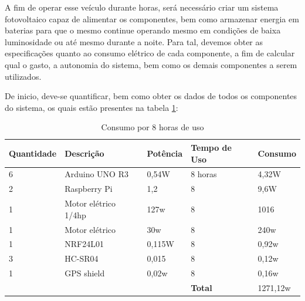 A fim de operar esse veículo durante horas, será necessário criar um sistema fotovoltaico capaz de alimentar os componentes, bem como armazenar energia em baterias para que o mesmo continue operando mesmo em condições de baixa luminosidade ou até mesmo durante a noite. Para tal, devemos obter as especificações quanto ao consumo elétrico de cada componente, a fim de calcular qual o gasto, a autonomia do sistema, bem como os demais componentes a serem utilizados.

De inicio, deve-se quantificar, bem como obter os dados de todos os componentes do sistema, os quais estão presentes na tabela \ref{cap:proposta:tab:quantificar}:


\begin{table}[]
\centering
\caption{Consumo por 8 horas de uso}
\label{cap:proposta:tab:quantificar}
\begin{tabular}{lll|l|l|}
\hline
\multicolumn{1}{|l|}{\textbf{Quantidade}} & \multicolumn{1}{l|}{\textbf{Descrição}}   & \textbf{Potência} & \textbf{Tempo de Uso} & \textbf{Consumo} \\ \hline
\multicolumn{1}{|l|}{6}                   & \multicolumn{1}{l|}{Arduino UNO R3}       & 0,54W             & 8 horas               & 4,32W            \\ \hline
\multicolumn{1}{|l|}{2}                   & \multicolumn{1}{l|}{Raspberry Pi}         & 1,2               & 8                     & 9,6W             \\ \hline
\multicolumn{1}{|l|}{1}                   & \multicolumn{1}{l|}{Motor elétrico 1/4hp} & 127w             & 8                     & 1016         \\ \hline
\multicolumn{1}{|l|}{1}                   & \multicolumn{1}{l|}{Motor elétrico}       & 30w               & 8                     & 240w             \\ \hline
\multicolumn{1}{|l|}{1}                   & \multicolumn{1}{l|}{NRF24L01}             & 0,115W            & 8                     & 0,92w            \\ \hline
\multicolumn{1}{|l|}{3}                   & \multicolumn{1}{l|}{HC-SR04}              & 0,015             & 8                     & 0,12w            \\ \hline
\multicolumn{1}{|l|}{1}                   & \multicolumn{1}{l|}{GPS shield}           & 0,02w             & 8                     & 0,16w            \\ \hline
                                          &                                           &                   & \textbf{Total}        & 1271,12w      \\ \cline{4-5} 
\end{tabular}
\end{table}

